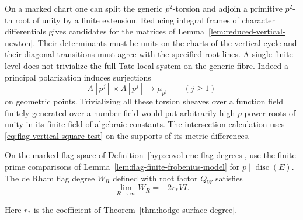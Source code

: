 On a marked chart one can split the generic \(p^2\)-torsion and adjoin
a primitive \(p^2\)-th root of unity by a finite extension. Reducing
integral frames of character differentials gives candidates for the
matrices of Lemma~\ref{lem:reduced-vertical-newton}. Their determinants
must be units on the charts of the vertical cycle and their diagonal
transitions must agree with the specified root lines. A single
finite level does not trivialize the full Tate local system on the
generic fibre. Indeed a principal polarization induces surjections
\[
         A[p^j]\times A[p^j]\longrightarrow\mu_{p^j}
                           \qquad (j\ge1)
\]
on geometric points. Trivializing all these torsion sheaves over a
function field finitely generated over a number field would put
arbitrarily high \(p\)-power roots of unity in its finite field of
algebraic constants. The intersection calculation uses
\eqref{eq:flag-vertical-square-test} on the supports of its metric
differences.

\begin{proposition}\label{prop:flag-de-rham-limit}
On the marked flag space of Definition~\ref{hyp:covolume-flag-degrees},
use the finite-prime comparisons of
Lemma~\ref{lem:flag-finite-frobenius-model} for \(p\mid\operatorname{disc}(E)\).
The de Rham flag degree \(W_R\) defined with root factor \(Q_W\) satisfies
\[
 \lim_{R\to\infty}W_R=-2r_*VI.
\]

Here \(r_*\) is the coefficient of Theorem~\ref{thm:hodge-surface-degree}.
\end{proposition}

